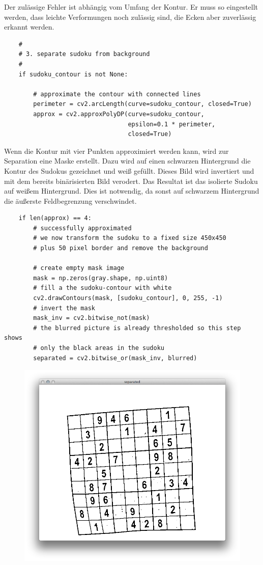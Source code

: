 Der zulässige Fehler ist abhängig vom Umfang der Kontur.
Er muss so eingestellt werden, dass leichte Verformungen noch zulässig sind, die Ecken aber zuverlässig erkannt werden.

\begin{lstlisting}
    #
    # 3. separate sudoku from background
    #
    if sudoku_contour is not None:

        # approximate the contour with connected lines
        perimeter = cv2.arcLength(curve=sudoku_contour, closed=True)
        approx = cv2.approxPolyDP(curve=sudoku_contour,
                                  epsilon=0.1 * perimeter,
                                  closed=True)
\end{lstlisting}

Wenn die Kontur mit vier Punkten approximiert werden kann, wird zur Separation eine Maske erstellt.
Dazu wird auf einen schwarzen Hintergrund die Kontur des Sudokus gezeichnet und weiß gefüllt.
Dieses Bild wird invertiert und mit dem bereits binärisierten Bild verodert.
Das Resultat ist das isolierte Sudoku auf weißem Hintergrund.
Dies ist notwendig, da sonst auf schwarzem Hintergrund die äußerste Feldbegrenzung verschwindet.

\begin{lstlisting}
    if len(approx) == 4:
        # successfully approximated
        # we now transform the sudoku to a fixed size 450x450
        # plus 50 pixel border and remove the background

        # create empty mask image
        mask = np.zeros(gray.shape, np.uint8)
        # fill a the sudoku-contour with white
        cv2.drawContours(mask, [sudoku_contour], 0, 255, -1)
        # invert the mask
        mask_inv = cv2.bitwise_not(mask)
        # the blurred picture is already thresholded so this step shows
        # only the black areas in the sudoku
        separated = cv2.bitwise_or(mask_inv, blurred)
\end{lstlisting}

\begin{figure}[H]
    \begin{center}
        \includegraphics[width=.5\textwidth]{Abbildungen/separated}
    \end{center}
\end{figure}

